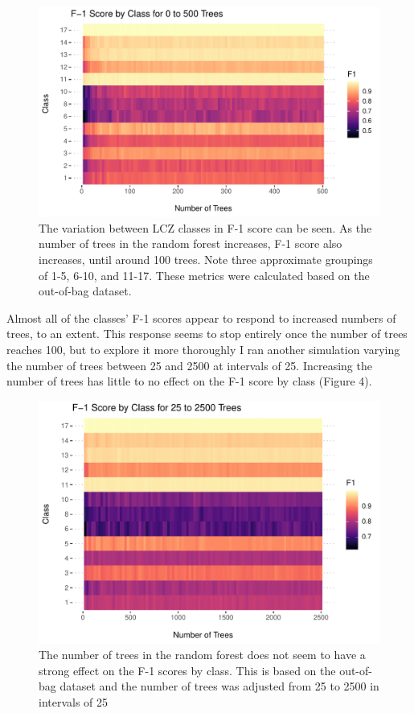 \documentclass[
]{article}
\begin{document}
\begin{figure}[H]

{\centering \includegraphics[width=0.75\linewidth]{../results/plots/ntree_5_to_500_heatmap} 

}

\caption{The variation between LCZ classes in F-1 score can be seen. As the number of trees in the random forest increases, F-1 score also increases, until around 100 trees. Note three approximate groupings of 1-5, 6-10, and 11-17. These metrics were calculated based on the out-of-bag dataset.}\label{fig:image-ref-for-in-text2}
\end{figure}

Almost all of the classes' F-1 scores appear to respond to increased
numbers of trees, to an extent. This response seems to stop entirely
once the number of trees reaches 100, but to explore it more thoroughly
I ran another simulation varying the number of trees between 25 and 2500
at intervals of 25. Increasing the number of trees has little to no
effect on the F-1 score by class (Figure 4).

\begin{figure}[H]

{\centering \includegraphics[width=0.75\linewidth]{../results/plots/ntree_25_to_2500_heatmap} 

}

\caption{The number of trees in the random forest does not seem to have a strong effect on the F-1 scores by class. This is based on the out-of-bag dataset and the number of trees was adjusted from 25 to 2500 in intervals of 25}\label{fig:image-ref-for-in-text3}
\end{figure}
\end{document}
